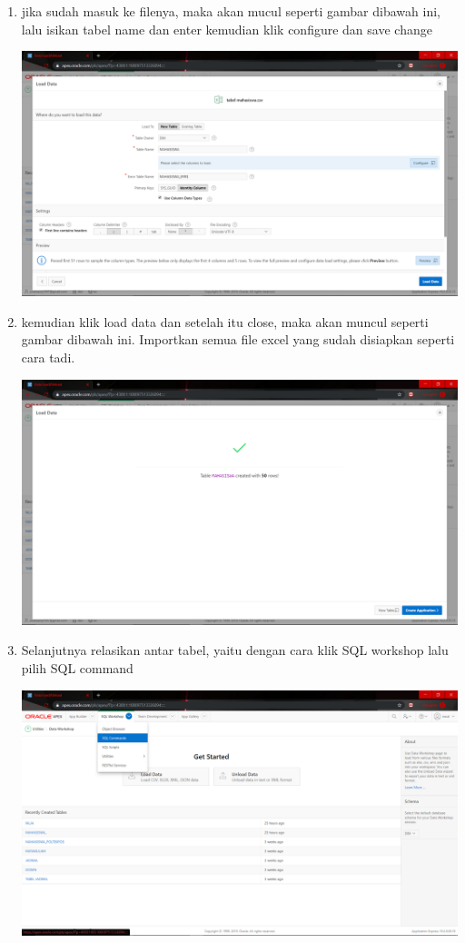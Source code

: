 \begin{enumerate}
	\item jika sudah masuk ke filenya, maka akan mucul seperti gambar dibawah ini, lalu isikan tabel name dan enter kemudian klik configure dan save change
	\begin{center}
    \includegraphics[scale=0.2]{Apex/50.png}
    \end{center}
    
    \item kemudian klik load data dan setelah itu close, maka akan muncul seperti gambar dibawah ini. Importkan semua file excel yang sudah disiapkan seperti cara tadi.
	\begin{center}
    \includegraphics[scale=0.2]{Apex/58.png}
    \end{center}
    
    \item Selanjutnya relasikan antar tabel, yaitu dengan cara klik SQL workshop lalu pilih SQL command
	\begin{center}
    \includegraphics[scale=0.2]{Apex/59.png}
    \end{center}
    

\end{enumerate}
